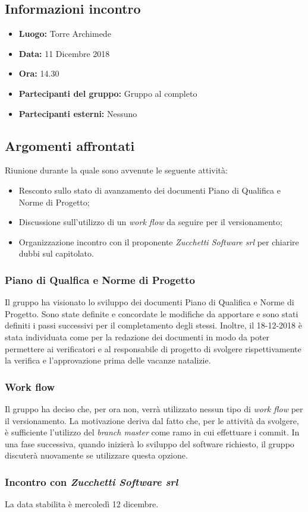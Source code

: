 \subsection{Informazioni incontro}
\begin{itemize}
	\item { \textbf{Luogo:} Torre Archimede  }
	\item { \textbf{Data:} 11 Dicembre 2018 }
	\item { \textbf{Ora:} 14.30 }
	\item { \textbf{Partecipanti del gruppo:} Gruppo al completo }
	\item { \textbf{Partecipanti esterni:} Nessuno }
\end{itemize}


\subsection{Argomenti affrontati}
Riunione durante la quale sono avvenute le seguente attività:
\begin{itemize}
	\item{Resconto sullo stato di avanzamento dei documenti Piano di Qualifica e Norme di Progetto; }
	\item{Discussione sull'utilizzo di un \emph{work flow} da seguire per il versionamento;}
	\item{Organizzazione incontro con il proponente \emph{Zucchetti Software srl} per chiarire dubbi sul capitolato. }
\end{itemize}

\subsubsection{Piano di Qualfica e Norme di Progetto}
Il gruppo ha visionato lo sviluppo dei documenti Piano di Qualifica e Norme di Progetto. Sono state definite e concordate le modifiche da apportare e sono stati definiti i passi successivi per il completamento degli stessi. Inoltre, il 18-12-2018 è stata individuata come  per la redazione dei documenti in modo da poter permettere ai verificatori e al responsabile di progetto di svolgere rispettivamente la verifica e l'approvazione prima delle vacanze natalizie.

\subsubsection{Work flow}
Il gruppo ha deciso che, per ora non, verrà utilizzato nessun tipo di \emph{work flow} per il versionamento. La motivazione deriva dal fatto che, per le attività da svolgere, è sufficiente l'utilizzo del \emph{branch master} come ramo in cui effettuare i commit. In una fase successiva, quando inizierà lo sviluppo del software richiesto, il gruppo discuterà nuovamente se utilizzare questa opzione.

\subsubsection{Incontro con \emph{Zucchetti Software srl}}
La data stabilita è mercoledì 12 dicembre.